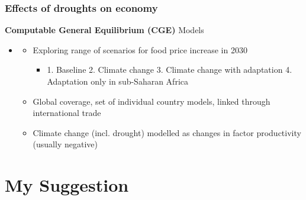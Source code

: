 \documentclass{beamer}              %
\begin{document}
\begin{frame}

\frametitle{Effects of droughts on economy}\label{Effects} 
\begin{block}{\textbf{Computable General Equilibrium (CGE)} Models }
\begin{itemize}




\item \underline{\textbf{\cite{OxfamIDS}}}
\begin{itemize}
\item Exploring range of scenarios for food price increase in 2030
\begin{itemize}
\item 1. Baseline 2. Climate change 3. Climate change with adaptation 4. Adaptation only in sub-Saharan Africa
\end{itemize}
\item Global coverage, set of individual country models, linked through international trade
\item Climate change (incl. drought) modelled as changes in factor productivity (usually negative)

\end{itemize}

\end{itemize}
\end{block}
\end{frame}





























\section{My Suggestion}
\end{document}
